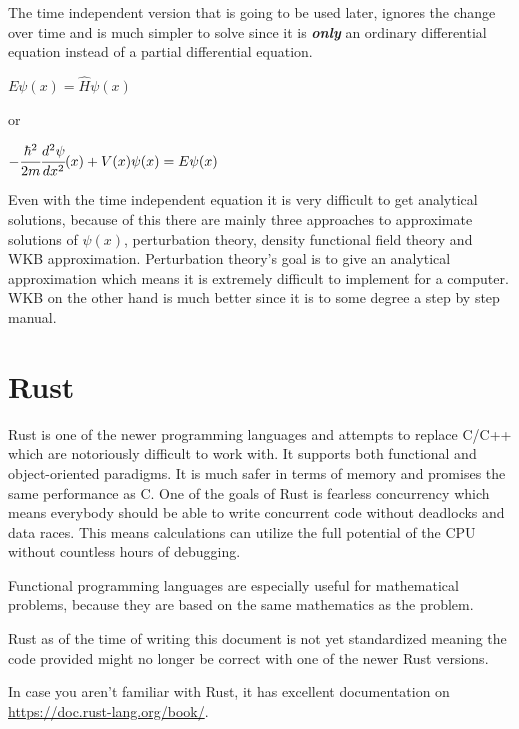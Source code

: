 \documentclass[11pt,DIV=10,final]{scrreprt} %
\begin{document}
The time independent version that is going to be used later, ignores the change over time and is much simpler to solve since it is \emph{\textbf{only}} an ordinary differential equation instead of a
partial differential equation.
\begin{center}
\begin{math}
  E \psi (x)=\hat{H} \psi(x)
\end{math}
\end{center}
or
\begin{center}
\begin{math}
  -{\cfrac{\hbar^{2}}{2m}}  \cfrac{d^{2} \psi}{dx^{2}} (x) + V(x) \psi(x) = E \psi(x)
\end{math}
\end{center}

Even with the time independent equation it is very difficult to get analytical solutions, because of this there are mainly three approaches to
approximate solutions of $\psi(x)$, perturbation theory, density functional field theory and WKB approximation. Perturbation theory's goal is to give an analytical approximation which means it
is extremely difficult to implement for a computer. WKB on the other hand is much better since it is to some degree a step by step manual.
\section{Rust}
Rust is one of the newer programming languages and attempts to replace C/C++ which are notoriously difficult to work with. It supports both functional and object-oriented paradigms. It is much safer in terms of memory and promises the same performance as C. One of the goals of Rust is fearless concurrency which means everybody should
be able to write concurrent code without deadlocks and data races. This means calculations can utilize the full potential of the CPU without countless hours of debugging.

Functional programming languages are especially useful for mathematical problems, because they are based on the same mathematics as the problem.

Rust as of the time of writing this document is not yet standardized meaning the code provided might no longer be correct with one of the newer Rust versions.

In case you aren't familiar with Rust, it has excellent documentation on \url{https://doc.rust-lang.org/book/}.
\end{document}

